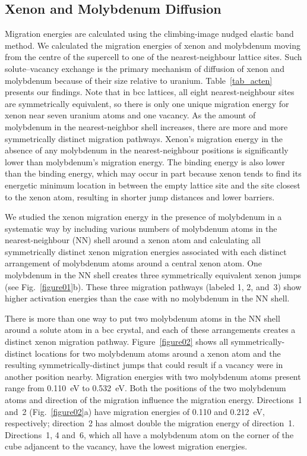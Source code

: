 \subsection{Xenon and Molybdenum Diffusion}
Migration energies are calculated using the climbing-image nudged elastic band
method. We calculated the migration energies of xenon and molybdenum moving
from the centre of the supercell to one of the nearest-neighbour lattice sites.
Such solute--vacancy exchange is the primary mechanism of diffusion of xenon
and molybdenum because of their size relative to uranium.
Table~\ref{tab_acten} presents our findings.
Note that in bcc lattices, all eight nearest-neighbour sites are symmetrically
equivalent, so there is only one unique migration energy for xenon near seven
uranium atoms and one vacancy.
As the amount of molybdenum in the nearest-neighbor shell increases,
there are more and more symmetrically distinct migration pathways.
Xenon's migration energy in the absence of any molybdenum in the
nearest-neighbour positions is significantly lower than molybdenum's migration
energy.
The  binding energy is also lower than the  binding
energy, which may occur in part because xenon tends to find its energetic
minimum location in between the empty lattice site and the site closest to the
xenon atom, resulting in shorter jump distances and lower barriers. 

We studied the xenon migration energy in the presence of molybdenum in a
systematic way by including various numbers of molybdenum atoms in the
nearest-neighbour (NN) shell around a xenon atom and calculating all
symmetrically distinct xenon migration energies associated with each distinct
arrangement of molybdenum atoms around a central xenon atom.
One molybdenum in the NN shell creates three symmetrically equivalent xenon
jumps (see Fig.~\ref{figure01}b). These three migration pathways (labeled 1, 2,
and~3) show higher activation energies than the case with no molybdenum in the
NN shell.

There is more than one way to put two molybdenum atoms in the
NN shell around a solute atom in a bcc crystal, and each of these arrangements
creates a distinct xenon migration pathway. Figure~\ref{figure02} shows all
symmetrically-distinct locations for two molybdenum atoms around a xenon atom
and the resulting symmetrically-distinct jumps that could result if a vacancy
were in another position nearby. Migration energies with two molybdenum atoms
present range from 0.110~eV to 0.532~eV\@. 
Both the positions of the two molybdenum atoms and direction of the migration
influence the migration energy.
Directions~1 and~2 (Fig.~\ref{figure02}a) have migration energies of 0.110
and 0.212~eV, respectively; direction~2 has almost double the migration energy
of direction~1.
Directions~1, 4 and~6, which all have a molybdenum atom on the corner of the
cube adjancent to the vacancy, have the lowest migration energies.

